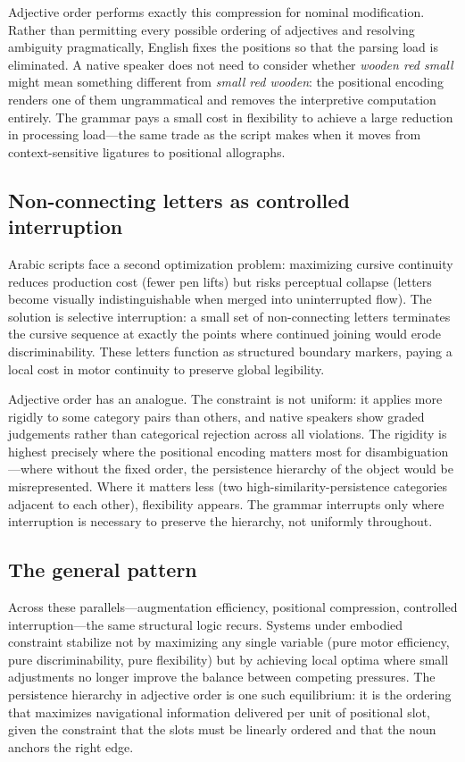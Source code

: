 \documentclass[11pt]{article}
\theoremstyle{rthm}
\theoremstyle{rdef}
\theoremstyle{remark}
\begin{document}
Adjective order performs exactly this compression for nominal modification.
Rather than permitting every possible ordering of adjectives and resolving
ambiguity pragmatically, English fixes the positions so that the parsing
load is eliminated. A native speaker does not need to consider whether
\emph{wooden red small} might mean something different from \emph{small red
wooden}: the positional encoding renders one of them ungrammatical and
removes the interpretive computation entirely. The grammar pays a small cost
in flexibility to achieve a large reduction in processing load---the same
trade as the script makes when it moves from context-sensitive ligatures to
positional allographs.

\subsection{Non-connecting letters as controlled interruption}

Arabic scripts face a second optimization problem: maximizing cursive
continuity reduces production cost (fewer pen lifts) but risks perceptual
collapse (letters become visually indistinguishable when merged into
uninterrupted flow). The solution is selective interruption: a small set of
non-connecting letters terminates the cursive sequence at exactly the points
where continued joining would erode discriminability. These letters function
as structured boundary markers, paying a local cost in motor continuity to
preserve global legibility.

Adjective order has an analogue. The constraint is not uniform: it applies
more rigidly to some category pairs than others, and native speakers show
graded judgements rather than categorical rejection across all violations.
The rigidity is highest precisely where the positional encoding matters most
for disambiguation---where without the fixed order, the persistence hierarchy
of the object would be misrepresented. Where it matters less (two
high-similarity-persistence categories adjacent to each other), flexibility
appears. The grammar interrupts only where interruption is necessary to
preserve the hierarchy, not uniformly throughout.

\subsection{The general pattern}

Across these parallels---augmentation efficiency, positional compression,
controlled interruption---the same structural logic recurs. Systems under
embodied constraint stabilize not by maximizing any single variable (pure
motor efficiency, pure discriminability, pure flexibility) but by achieving
local optima where small adjustments no longer improve the balance between
competing pressures. The persistence hierarchy in adjective order is one
such equilibrium: it is the ordering that maximizes navigational information
delivered per unit of positional slot, given the constraint that the slots
must be linearly ordered and that the noun anchors the right edge.
\end{document}

